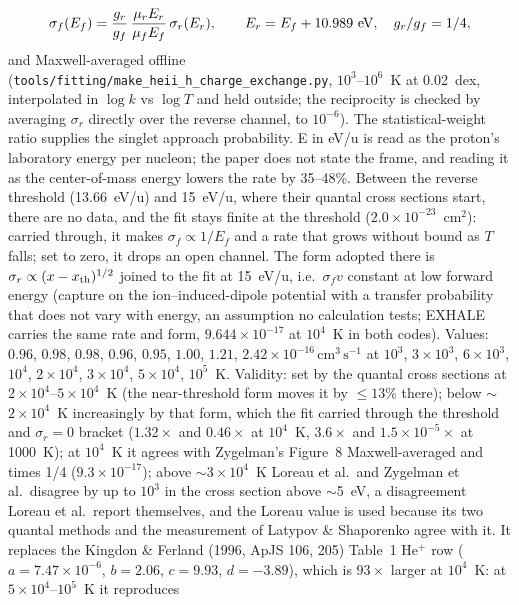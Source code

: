 \documentclass[english,a4paper]{my_memo}
\newcommand{\code}[1]{\texttt{#1}}
\newcommand{\cmc}{\mathrm{cm^{3}\,s^{-1}}}
\begin{document}
\begin{itemize}
  \[
    \sigma_f(E_f) = \frac{g_r}{g_f}\,\frac{\mu_r E_r}{\mu_f E_f}\,\sigma_r(E_r),
    \qquad E_r = E_f + 10.989~{\rm eV},\quad g_r/g_f = 1/4 ,
  \]
  and Maxwell-averaged offline (\code{tools/fitting/make\_heii\_h\_charge\_exchange.py},
  $10^3$--$10^6$~K at 0.02~dex, interpolated in $\log k$ vs $\log T$ and
  held outside; the reciprocity is checked by averaging $\sigma_r$ directly
  over the reverse channel, to $10^{-6}$).  The statistical-weight ratio
  supplies the singlet approach probability.  E in eV/u is read as the
  proton's laboratory energy per nucleon; the paper does not state the
  frame, and reading it as the center-of-mass energy lowers the rate by
  35--48\%.  Between the reverse threshold (13.66~eV/u) and 15~eV/u, where
  their quantal cross sections start, there are no data, and the fit stays
  finite at the threshold ($2.0\times10^{-23}$~cm$^2$): carried through, it
  makes $\sigma_f \propto 1/E_f$ and a rate that grows without bound as $T$
  falls; set to zero, it drops an open channel.  The form adopted there is
  $\sigma_r \propto (x - x_{\rm th})^{1/2}$ joined to the fit at 15~eV/u,
  i.e.\ $\sigma_f v$ constant at low forward energy (capture on the
  ion--induced-dipole potential with a transfer probability that does not
  vary with energy, an assumption no calculation tests; EXHALE carries the
  same rate and form, $9.644\times10^{-17}$ at $10^4$~K in both codes).  Values: $0.96$, $0.98$, $0.98$, $0.96$, $0.95$, $1.00$,
  $1.21$, $2.42{\times}10^{-16}\,\cmc$ at $10^3$, $3\times10^3$,
  $6\times10^3$, $10^4$, $2\times10^4$, $3\times10^4$, $5\times10^4$,
  $10^5$~K.  Validity: set by the quantal cross sections at
  $2\times10^4$--$5\times10^4$~K (the near-threshold form moves it by
  $\le 13\%$ there); below $\sim$$2\times10^4$~K increasingly by that form,
  which the fit carried through the threshold and $\sigma_r = 0$ bracket
  ($1.32\times$ and $0.46\times$ at $10^4$~K, $3.6\times$ and
  $1.5\times10^{-5}\times$ at 1000~K); at $10^4$~K it agrees with Zygelman's
  Figure~8 Maxwell-averaged and times 1/4 ($9.3\times10^{-17}$); above
  $\sim$$3\times10^4$~K
  Loreau et al.\ and Zygelman et al.\ disagree by up to $10^3$ in the cross
  section above $\sim$5~eV, a disagreement Loreau et al.\ report themselves,
  and the Loreau value is used because its two quantal methods and the
  measurement of Latypov \& Shaporenko agree with it.  It replaces the
  Kingdon \& Ferland (1996, ApJS 106, 205) Table~1 He$^+$ row ($a =
  7.47{\times}10^{-6}$, $b = 2.06$, $c = 9.93$, $d = -3.89$), which is
  $93\times$ larger at $10^4$~K: at $5\times10^4$--$10^5$~K it reproduces

\end{itemize}
\end{document}
